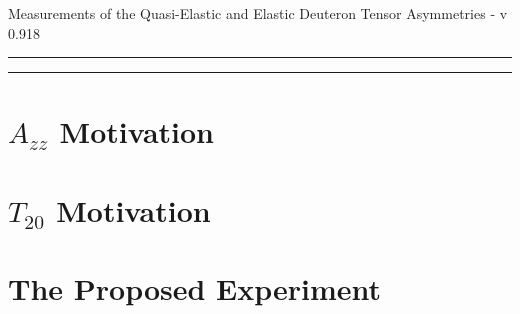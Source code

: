 \documentclass[12pt]{article}
\begin{document}
\linenumbers
\pagestyle{empty}
 
\begin{center}
 \LARGE{
  Measurements of the Quasi-Elastic and Elastic Deuteron Tensor Asymmetries
 }
- v 0.918
\end{center}
%
\hrule \vspace{.05cm}\hrule
%


\newpage

\begin{abstract}
  
\end{abstract}

\newpage


%


\clearpage


\tableofcontents


\pagestyle{plain}

\clearpage

%

\section{$A_{zz}$ Motivation}











\section{$T_{20}$ Motivation}



\section{The Proposed Experiment}
\end{document}
